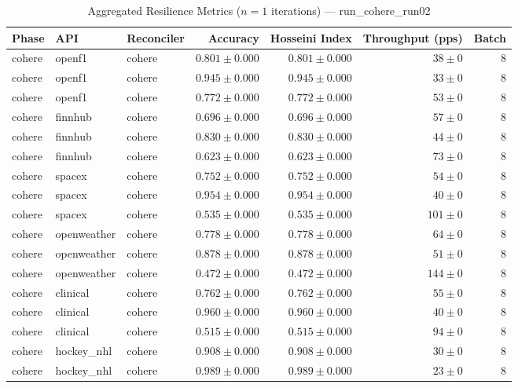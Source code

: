 
\begin{table}[htbp]
\caption{Aggregated Resilience Metrics ($n=1$ iterations) --- run_cohere_run02}
\begin{tabular}{l l l r r r r}
\hline
Phase & API & Reconciler & Accuracy & Hosseini Index & Throughput (pps) & Batch \\
\hline
cohere & openf1 & cohere & $0.801\pm0.000$ & $0.801\pm0.000$ & $38\pm0$ & 8 \\
cohere & openf1 & cohere & $0.945\pm0.000$ & $0.945\pm0.000$ & $33\pm0$ & 8 \\
cohere & openf1 & cohere & $0.772\pm0.000$ & $0.772\pm0.000$ & $53\pm0$ & 8 \\
cohere & finnhub & cohere & $0.696\pm0.000$ & $0.696\pm0.000$ & $57\pm0$ & 8 \\
cohere & finnhub & cohere & $0.830\pm0.000$ & $0.830\pm0.000$ & $44\pm0$ & 8 \\
cohere & finnhub & cohere & $0.623\pm0.000$ & $0.623\pm0.000$ & $73\pm0$ & 8 \\
cohere & spacex & cohere & $0.752\pm0.000$ & $0.752\pm0.000$ & $54\pm0$ & 8 \\
cohere & spacex & cohere & $0.954\pm0.000$ & $0.954\pm0.000$ & $40\pm0$ & 8 \\
cohere & spacex & cohere & $0.535\pm0.000$ & $0.535\pm0.000$ & $101\pm0$ & 8 \\
cohere & openweather & cohere & $0.778\pm0.000$ & $0.778\pm0.000$ & $64\pm0$ & 8 \\
cohere & openweather & cohere & $0.878\pm0.000$ & $0.878\pm0.000$ & $51\pm0$ & 8 \\
cohere & openweather & cohere & $0.472\pm0.000$ & $0.472\pm0.000$ & $144\pm0$ & 8 \\
cohere & clinical & cohere & $0.762\pm0.000$ & $0.762\pm0.000$ & $55\pm0$ & 8 \\
cohere & clinical & cohere & $0.960\pm0.000$ & $0.960\pm0.000$ & $40\pm0$ & 8 \\
cohere & clinical & cohere & $0.515\pm0.000$ & $0.515\pm0.000$ & $94\pm0$ & 8 \\
cohere & hockey\_nhl & cohere & $0.908\pm0.000$ & $0.908\pm0.000$ & $30\pm0$ & 8 \\
cohere & hockey\_nhl & cohere & $0.989\pm0.000$ & $0.989\pm0.000$ & $23\pm0$ & 8 \\

\end{tabular}
\end{table}
